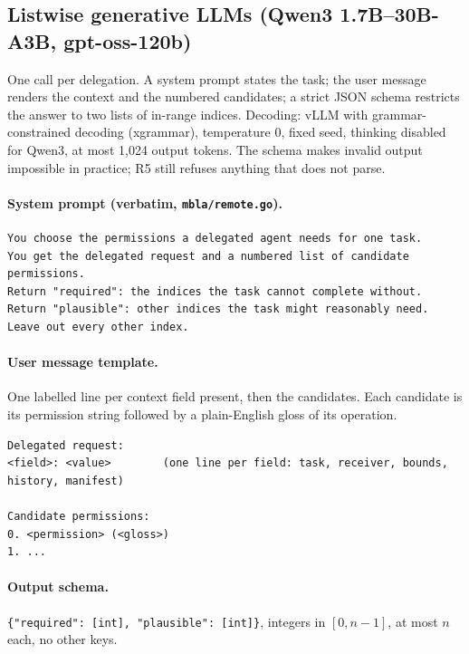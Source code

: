 \documentclass[10pt]{article}
\begin{document}
\subsection{Listwise generative LLMs (Qwen3 1.7B--30B-A3B, gpt-oss-120b)}
One call per delegation. A system prompt states the task; the user message renders the context and the numbered
candidates; a strict JSON schema restricts the answer to two lists of in-range indices. Decoding: vLLM with grammar-constrained
decoding (xgrammar), temperature 0, fixed seed, thinking disabled for Qwen3, at most 1,024 output tokens. The schema makes
invalid output impossible in practice; R5 still refuses anything that does not parse.

\paragraph{System prompt (verbatim, \texttt{mbla/remote.go}).}
\begin{lstlisting}
You choose the permissions a delegated agent needs for one task.
You get the delegated request and a numbered list of candidate permissions.
Return "required": the indices the task cannot complete without.
Return "plausible": other indices the task might reasonably need.
Leave out every other index.
\end{lstlisting}
\paragraph{User message template.} One labelled line per context field present, then the candidates. Each candidate is
its permission string followed by a plain-English gloss of its operation.
\begin{lstlisting}
Delegated request:
<field>: <value>        (one line per field: task, receiver, bounds, history, manifest)

Candidate permissions:
0. <permission> (<gloss>)
1. ...
\end{lstlisting}
\paragraph{Output schema.} \texttt{\{"required": [int], "plausible": [int]\}}, integers in $[0, n-1]$, at most $n$ each,
no other keys.
\end{document}
